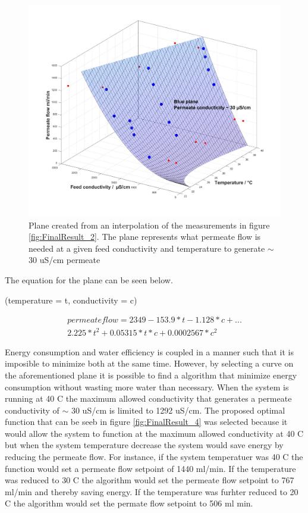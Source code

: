 \begin{figure}[H]
    \centering
    \includegraphics[width=1.1\textwidth]{FinalResult_3}
    \caption{Plane created from an interpolation of the measurements in figure \ref{fig:FinalResult_2}. The plane represents what permeate flow is needed at a given feed conductivity and temperature to generate  $\sim$ 30 uS/cm permeate}
    \label{fig:FinalResult_3}
\end{figure}

The equation for the plane can be seen below.

(temperature = t, conductivity = c)

\begin{multline}
 permeate flow =  2349-153.9*t-1.128*c+...\\
2.225*t^2+0.05315*t*c+0.0002567*c^2
\end{multline}

\newpage





Energy consumption and water efficiency is coupled in a manner such that it is imposible to minimize both at the same time. However, by selecting a curve on the aforementioned plane it is possible to find a algorithm that minimize energy consumption without wasting more water than necessary. When the system is running at 40 C the maximum allowed conductivity that generates a permeate conductivity of  $\sim$ 30 uS/cm is limited to 1292 uS/cm. The proposed optimal function that can be seeb in figure \ref{fig:FinalResult_4} was selected because it would allow the system to function at the maximum allowed conductivity at 40 C but when the system temperature decrease the system would save energy by reducing the permeate flow. For instance, if the system temperatuer was 40 C the function would set a permeate flow setpoint of 1440 ml/min. If the temperature was reduced to 30 C the algorithm would set the permeate flow setpoint to  767 ml/min and thereby saving energy. If the temperature was furhter reduced to 20 C the algorithm would set the permate flow setpoint to 506 ml min. 


